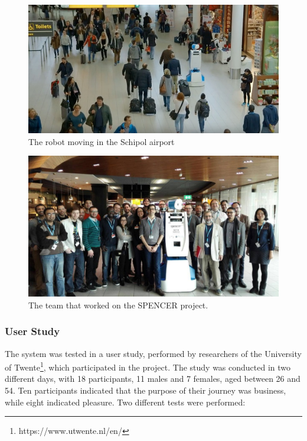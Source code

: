 \begin{figure}[ht!]
	\centering
	\includegraphics[scale=0.45]{img/case_study/spencer/spencer_schiphol.png}
	\caption{The robot moving in the Schipol airport}
	\label{fig:case_study-spencer-spencer_moving}
\end{figure}


\begin{figure}[ht!]
	\centering
	\includegraphics[scale=0.45]{img/case_study/spencer/all.jpg}
	\caption{The team that worked on the SPENCER project.}
	\label{fig:case_study-spencer-team}
\end{figure}

\subsubsection{User Study}

The system was tested in a user study, performed by researchers of the University of Twente\footnote{https://www.utwente.nl/en/}, which participated in the project. The study was conducted in two different days, with 18 participants, 11 males and 7 females, aged between 26 and 54. Ten participants indicated that the purpose of their journey was business, while eight indicated pleasure. Two different tests were performed:

